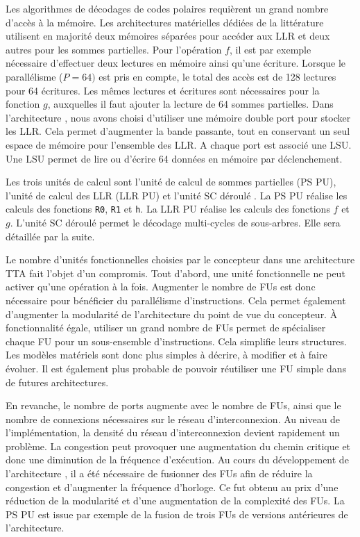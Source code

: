 Les algorithmes de décodages de codes polaires requièrent un grand nombre d'accès à la mémoire. Les architectures matérielles dédiées de la littérature utilisent en majorité deux mémoires séparées pour accéder aux LLR et deux autres pour les sommes partielles. Pour l'opération $f$, il est par exemple nécessaire d'effectuer deux lectures en mémoire ainsi qu'une écriture. Lorsque le parallélisme ($P=64)$ est pris en compte, le total des accès est de 128 lectures pour 64 écritures. Les mêmes lectures et écritures sont nécessaires pour la fonction $g$, auxquelles il faut ajouter la lecture de 64 sommes partielles. Dans l'architecture \TTSC, nous avons choisi d'utiliser une mémoire double port pour stocker les LLR. Cela permet d'augmenter la bande passante, tout en conservant un seul espace de mémoire pour l'ensemble des LLR. A chaque port est associé une LSU. Une LSU permet de lire ou d'écrire 64 données en mémoire par déclenchement.

Les trois unités de calcul sont l'unité de calcul de sommes partielles (PS PU), l'unité de calcul des LLR (LLR PU) et l'unité \og SC déroulé \fg. La PS PU réalise les calculs des fonctions \texttt{R0}, \texttt{R1} et \texttt{h}. La LLR PU réalise les calculs des fonctions $f$ et $g$. L'unité \og SC déroulé \fg permet le décodage multi-cycles de sous-arbres. Elle sera détaillée par la suite. 

Le nombre d'unités fonctionnelles choisies par le concepteur dans une architecture TTA fait l'objet d'un compromis.
Tout d'abord, une unité fonctionnelle ne peut activer qu'une opération à la fois.
Augmenter le nombre de FUs est donc nécessaire pour bénéficier du parallélisme d'instructions.
Cela permet également d'augmenter la modularité de l'architecture du point de vue du concepteur.
\`A fonctionnalité égale, utiliser un grand nombre de FUs permet de spécialiser chaque FU pour un sous-ensemble d'instructions. Cela simplifie leurs structures. Les modèles matériels sont donc plus simples à décrire, à modifier et à faire évoluer. Il est également plus probable de pouvoir réutiliser une FU simple dans de futures architectures.

En revanche, le nombre de ports augmente avec le nombre de FUs, ainsi que le nombre de connexions nécessaires sur le réseau d'interconnexion.
Au niveau de l'implémentation, la densité du réseau d'interconnexion devient rapidement un problème. 
La congestion peut provoquer une augmentation du chemin critique et donc une diminution de la fréquence d'exécution. 
Au cours du développement de l'architecture \TTSC, il a été nécessaire de fusionner des FUs afin de réduire la congestion et d'augmenter la fréquence d'horloge. Ce fut obtenu au prix d'une réduction de la modularité et d'une augmentation de la complexité des FUs. La PS PU est issue par exemple de la fusion de trois FUs de versions antérieures de l'architecture.

